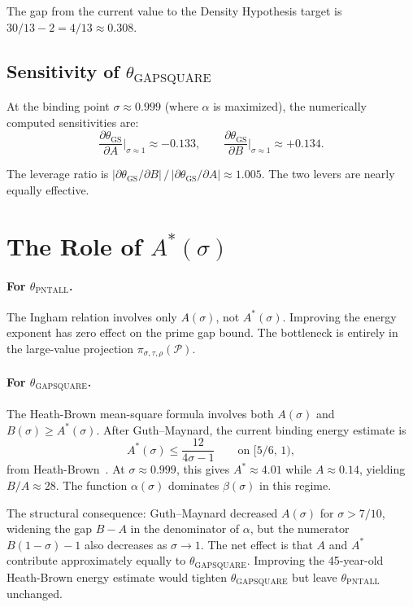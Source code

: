 \documentclass[11pt,a4paper]{article}
\begin{document}
The gap from the current value to the Density Hypothesis target is $30/13 - 2 = 4/13 \approx 0.308$.

\subsection*{Sensitivity of $\theta_{\mathrm{GAPSQUARE}}$}

At the binding point $\sigma \approx 0.999$ (where $\alpha$ is maximized), the numerically computed sensitivities are:
\[
  \frac{\partial\theta_{\mathrm{GS}}}{\partial A}\bigg|_{\sigma \approx 1} \approx -0.133,
  \qquad
  \frac{\partial\theta_{\mathrm{GS}}}{\partial B}\bigg|_{\sigma \approx 1} \approx +0.134.
\]

The leverage ratio is $|\partial\theta_{\mathrm{GS}}/\partial B| \,/\, |\partial\theta_{\mathrm{GS}}/\partial A| \approx 1.005$.  The two levers are nearly equally effective.

\section{The Role of $A^{*}(\sigma)$}

\paragraph{For $\theta_{\mathrm{PNTALL}}$.}  The Ingham relation involves only $A(\sigma)$, not $A^{*}(\sigma)$.  Improving the energy exponent has zero effect on the prime gap bound.  The bottleneck is entirely in the large-value projection $\pi_{\sigma,\tau,\rho}(\mathcal{P})$.

\paragraph{For $\theta_{\mathrm{GAPSQUARE}}$.}  The Heath-Brown mean-square formula involves both $A(\sigma)$ and $B(\sigma) \ge A^{*}(\sigma)$.  After Guth--Maynard, the current binding energy estimate is
\[
  A^{*}(\sigma) \le \frac{12}{4\sigma - 1} \qquad \text{on } [5/6,\,1),
\]
from Heath-Brown~\cite{HB79zd}.  At $\sigma \approx 0.999$, this gives $A^{*} \approx 4.01$ while $A \approx 0.14$, yielding $B/A \approx 28$.  The function $\alpha(\sigma)$ dominates $\beta(\sigma)$ in this regime.

The structural consequence: Guth--Maynard decreased $A(\sigma)$ for $\sigma > 7/10$, widening the gap $B - A$ in the denominator of $\alpha$, but the numerator $B(1-\sigma) - 1$ also decreases as $\sigma \to 1$.  The net effect is that $A$ and $A^{*}$ contribute approximately equally to $\theta_{\mathrm{GAPSQUARE}}$.  Improving the 45-year-old Heath-Brown energy estimate would tighten $\theta_{\mathrm{GAPSQUARE}}$ but leave $\theta_{\mathrm{PNTALL}}$ unchanged.
\end{document}

